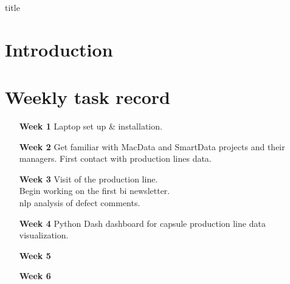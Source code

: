 \documentclass[12pt]{book}
\begin{document}
{title}

\tableofcontents


\chapter{Introduction}


\appendix
\chapter{Weekly task record}
\begin{itemize}
    \item [\textbf{Week 1}] Laptop set up \& installation.
    \item [\textbf{Week 2}]
          Get familiar with MacData and SmartData projects and their managers.
          First contact with production lines data.
    \item [\textbf{Week 3}]
          Visit of the production line. \\
          Begin working on the first \gls{bi} newsletter. \\
          \gls{nlp} analysis of defect comments.
    \item [\textbf{Week 4}]
          Python Dash dashboard for capsule production line data visualization.
    \item [\textbf{Week 5}]
    \item [\textbf{Week 6}]
\end{itemize}


\end{document}
